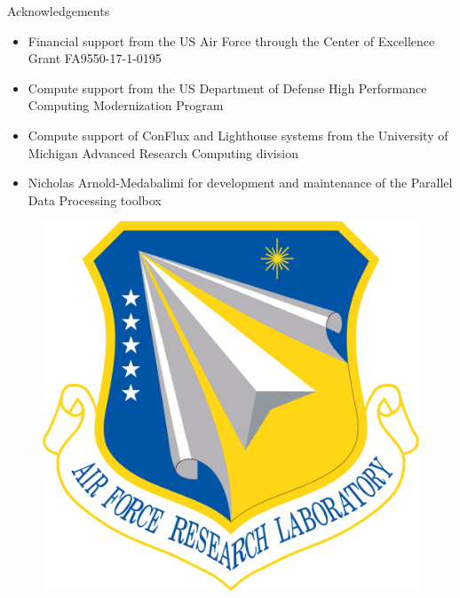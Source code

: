 \documentclass[]{beamer}
\begin{document}
\begin{frame}{Acknowledgements}
	\begin{itemize}
	    \item Financial support from the US Air Force through the Center of Excellence Grant FA9550-17-1-0195
	    \item Compute support from the US Department of Defense High Performance Computing Modernization Program
		\item Compute support of ConFlux and Lighthouse systems from the University of Michigan Advanced Research Computing division
		\item Nicholas Arnold-Medabalimi for development and maintenance of the Parallel Data Processing toolbox
	\end{itemize}
	\begin{minipage}{0.15\linewidth}
		\vspace{0.5em}
		\begin{figure}
			\includegraphics[width=0.99\linewidth]{afrlLogo.png}
		\end{figure}
	\end{minipage}
	\begin{minipage}{0.34\linewidth}
		\begin{figure}

\end{figure}
\end{minipage}
\end{frame}
\end{document}
